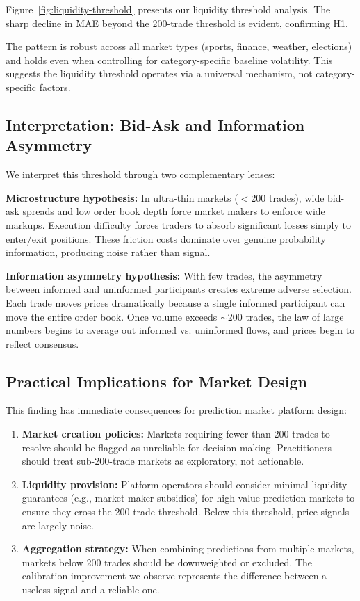 \documentclass[12pt,letterpaper]{article}
\begin{document}
Figure~\ref{fig:liquidity-threshold} presents our liquidity threshold analysis. The sharp decline in MAE beyond the 200-trade threshold is evident, confirming H1.

The pattern is robust across all market types (sports, finance, weather, elections) and holds even when controlling for category-specific baseline volatility. This suggests the liquidity threshold operates via a universal mechanism, not category-specific factors.

\subsection{Interpretation: Bid-Ask and Information Asymmetry}

We interpret this threshold through two complementary lenses:

\textbf{Microstructure hypothesis:} In ultra-thin markets ($<$200 trades), wide bid-ask spreads and low order book depth force market makers to enforce wide markups. Execution difficulty forces traders to absorb significant losses simply to enter/exit positions. These friction costs dominate over genuine probability information, producing noise rather than signal.

\textbf{Information asymmetry hypothesis:} With few trades, the asymmetry between informed and uninformed participants creates extreme adverse selection. Each trade moves prices dramatically because a single informed participant can move the entire order book. Once volume exceeds $\sim$200 trades, the law of large numbers begins to average out informed vs. uninformed flows, and prices begin to reflect consensus.

\subsection{Practical Implications for Market Design}

This finding has immediate consequences for prediction market platform design:

\begin{enumerate}
    \item \textbf{Market creation policies:} Markets requiring fewer than 200 trades to resolve should be flagged as unreliable for decision-making. Practitioners should treat sub-200-trade markets as exploratory, not actionable.
    
    \item \textbf{Liquidity provision:} Platform operators should consider minimal liquidity guarantees (e.g., market-maker subsidies) for high-value prediction markets to ensure they cross the 200-trade threshold. Below this threshold, price signals are largely noise.
    
    \item \textbf{Aggregation strategy:} When combining predictions from multiple markets, markets below 200 trades should be downweighted or excluded. The calibration improvement we observe represents the difference between a useless signal and a reliable one.
\end{enumerate}
\end{document}
